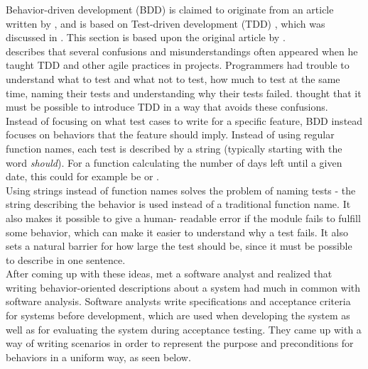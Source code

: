 Behavior-driven development (BDD) is claimed to originate from an
article written by \citet{web:dan_north}, and is based on Test-driven
development (TDD) \cite{wiki:bdd}, which was discussed in
. This section is based upon the original article by
\citet{web:dan_north}.\\

\citeauthor{web:dan_north} describes that several confusions and
misunderstandings often appeared when he taught TDD and other agile
practices in projects. Programmers had trouble to understand what to
test and what not to test, how much to test at the same time, naming
their tests and understanding why their tests failed.
\citeauthor{web:dan_north} thought that it must be possible to introduce
TDD in a way that avoids these confusions.\\

Instead of focusing on what test cases to write for a specific feature,
BDD instead focuses on behaviors that the feature should imply. Instead
of using regular function names, each test is described by a string
(typically starting with the word \emph{should}). For a function
calculating the number of days left until a given date, this could for
example be  or
.\\

Using strings instead of function names solves the problem of naming
tests - the string describing the behavior is used instead of a
traditional function name. It also makes it possible to give a human-
readable error if the module fails to fulfill some behavior, which can
make it easier to understand why a test fails. It also sets a natural
barrier for how large the test should be, since it must be possible to
describe in one sentence.\\

After coming up with these ideas, \citeauthor{web:dan_north} met a
software analyst and realized that writing behavior-oriented
descriptions about a system had much in common with software analysis.
Software analysts write specifications and acceptance criteria for
systems before development, which are used when developing the system as
well as for evaluating the system during acceptance testing. They came
up with a way of writing scenarios in order to represent the purpose and
preconditions for behaviors in a uniform way, as seen below.\\

\linebreak
\linebreak

